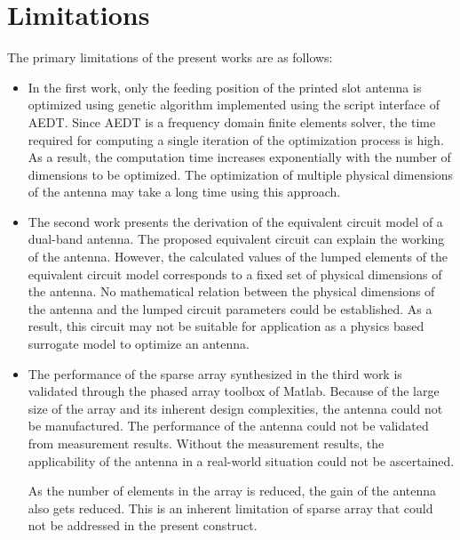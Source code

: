 \section{Limitations}\label{c6sec_limitations}
The primary limitations of the present works are as follows:
\begin{itemize}
\item In the first work, only the feeding position of the printed slot antenna is optimized using genetic algorithm implemented using the script interface of AEDT. Since AEDT is a frequency domain finite elements solver, the time required for computing a single iteration of the optimization process is high. As a result, the computation time increases exponentially with the number of dimensions to be optimized. The optimization of multiple physical dimensions of the antenna may take a long time using this approach.
\item The second work presents the derivation of the equivalent circuit model of a dual-band antenna. The proposed equivalent circuit can explain the working of the antenna. However, the calculated values of the lumped elements of the equivalent circuit model corresponds to a fixed set of physical dimensions of the antenna. No mathematical relation between the physical dimensions of the antenna and the lumped circuit parameters could be established. As a result, this circuit may not be suitable for application as a physics based surrogate model to optimize an antenna.
\item The performance of the sparse array synthesized in the third work is validated through the phased array toolbox of Matlab. Because of the large size of the array and its inherent design complexities, the antenna could not be manufactured. The performance of the antenna could not be validated from measurement results. Without the measurement results, the applicability of the antenna in a real-world situation could not be ascertained.
    
    As the number of elements in the array is reduced, the gain of the antenna also gets reduced. This is an inherent limitation of sparse array that could not be addressed in the present construct.
\end{itemize}

